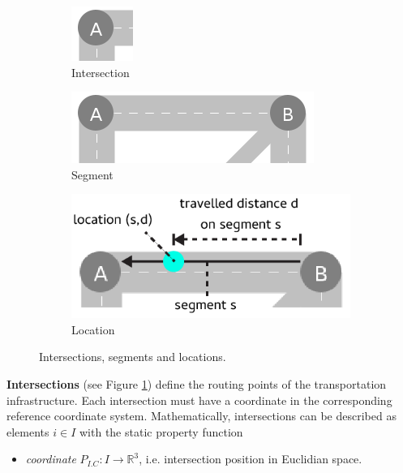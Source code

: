 \documentclass[graybox]{svmult}
\begin{document}
\begin{figure}
	\begin{subfigure}{.3\textwidth}
		\centering
		\includegraphics[scale=0.4]{../../concepts/intersection.png}
		\caption{Intersection}
		\label{fig:intersection}
	\end{subfigure}
	\hfill
	\begin{subfigure}{.3\textwidth}
		\centering
		\includegraphics[scale=0.4]{../../concepts/segment.png}
		\caption{Segment}
		\label{fig:segment}
	\end{subfigure}
	\hfill
		\begin{subfigure}{.3\textwidth}
		\centering
		\includegraphics[scale=0.4]{../../concepts/location.png}
		\caption{Location}
		\label{fig:location}
	\end{subfigure}
\hfill
	\caption{Intersections, segments and locations.}
	\label{fig:intersections-segments}	
\end{figure}
\vspace{4mm}

\noindent
\textbf{Intersections} (see Figure \ref{fig:intersection})
define the routing points of the transportation infrastructure.
Each intersection must have a coordinate in the corresponding reference coordinate system.
Mathematically, intersections can be described as elements $i \in I$ with the static property function
\begin{itemize}
	\item \textit{coordinate} $P_{I.C}: I \rightarrow \mathbb{R}^3$, i.e. intersection position in Euclidian space.
\end{itemize}
\vspace{2mm}
\end{document}
